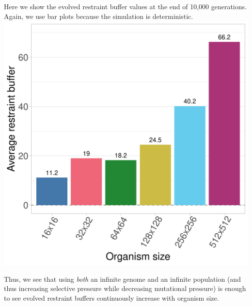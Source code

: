 \documentclass[
]{book}
\begin{document}
Here we show the evolved restraint buffer values at the end of 10,000 generations.
Again, we use bar plots because the simulation is deterministic.
\includegraphics{./inf_pop/inf_evolved_bars.png}

Thus, we see that using \emph{both} an infinite genome and an infinite population (and thus increasing selective pressure while decreasing mutational pressure) is enough to see evolved restraint buffers continuously increase with organism size.
\end{document}
